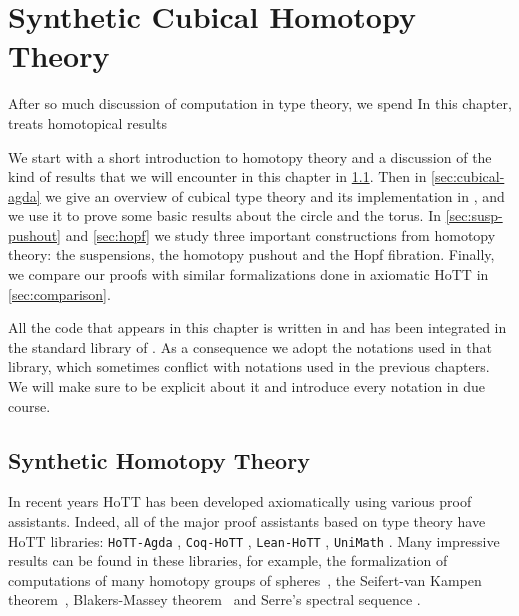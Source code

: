 \setchapterpreamble[u]{\margintoc}
\chapter{Synthetic Cubical Homotopy Theory}

After so much discussion of computation in type theory, we spend
In this chapter, treats homotopical results

We start with a short introduction to homotopy theory and a discussion of the
kind of results that we will encounter in this chapter in \cref{sec:synthetic}.
% 
Then in \cref{sec:cubical-agda} we give an overview of cubical type theory and
its implementation in \CubicalAgda, and we use it to prove some basic 
results about the circle and the torus.
% 
In \cref{sec:susp-pushout} and \cref{sec:hopf} we study three important 
constructions from homotopy theory: the suspensions, the homotopy pushout and
the Hopf fibration.
% 
Finally, we compare our proofs with similar formalizations done in axiomatic
HoTT in \cref{sec:comparison}.

All the code that appears in this chapter is written in \Agda and has been
integrated in the standard library of \CubicalAgda. 
% 
As a consequence we adopt the notations used in that library, which sometimes
conflict with notations used in the previous chapters. 
% 
We will make sure to be explicit about it and introduce every notation in due 
course.
\paragraph*{}
\section{Synthetic Homotopy Theory}
\label{sec:synthetic}

In recent years HoTT has been developed axiomatically using various
proof assistants. Indeed, all of the major proof assistants based on
type theory have HoTT libraries: \texttt{HoTT-Agda} , \texttt{Coq-HoTT}
, \texttt{Lean-HoTT} , \texttt{UniMath}
. Many impressive results can be found in these
libraries, for example, the formalization of computations of many
homotopy groups of spheres~, the
Seifert-van Kampen theorem~, Blakers-Massey
theorem~
and Serre's spectral sequence . 

